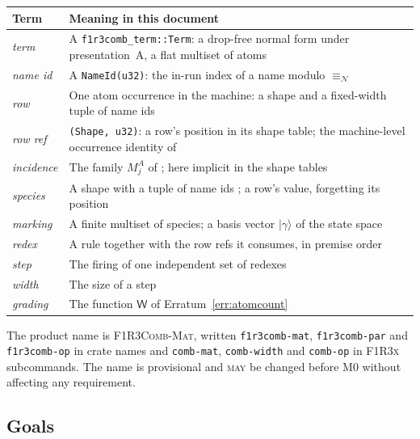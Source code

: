 \documentclass[11pt,a4paper]{article}
\newcommand{\code}[1]{\texttt{#1}}
\newcommand{\Mat}{\textsc{F1R3Comb-Mat}}
\newcommand{\Fx}{\textsc{F1R3x}}
\newcommand{\MAY}{\textsc{may}}
\newcommand{\nequiv}{\equiv_{\mathcal{N}}}
\newcommand{\Wt}{\mathsf{W}}
\theoremstyle{definition}
\theoremstyle{plain}
\begin{document}
\begin{center}
\begin{tabularx}{\linewidth}{@{}l>{\raggedright\arraybackslash}X@{}}
\toprule
Term & Meaning in this document\\
\midrule
\emph{term} & A \code{f1r3comb\_term::Term}: a drop-free normal form under
presentation~A, a flat multiset of atoms \cite[Req.~4.4]{combspec}\\
\emph{name id} & A \code{NameId(u32)}: the in-run index of a name modulo
$\nequiv$\\
\emph{row} & One atom occurrence in the machine: a shape and a fixed-width
tuple of name ids\\
\emph{row ref} & \code{(Shape, u32)}: a row's position in its shape table;
the machine-level occurrence identity of \cite[Def.~8.1]{matnote}\\
\emph{incidence} & The family $M^{A}_{j}$ of \cite[Def.~7.1]{matnote}; here
implicit in the shape tables\\
\emph{species} & A shape with a tuple of name ids \cite[Def.~4.1]{matnote}; a
row's value, forgetting its position\\
\emph{marking} & A finite multiset of species; a basis vector
$|\gamma\rangle$ of the state space\\
\emph{redex} & A rule together with the row refs it consumes, in premise
order\\
\emph{step} & The firing of one independent set of redexes\\
\emph{width} & The size of a step\\
\emph{grading} & The function $\Wt$ of Erratum~\ref{err:atomcount}\\
\bottomrule
\end{tabularx}
\end{center}

\noindent
The product name is \Mat{}, written \code{f1r3comb-mat}, \code{f1r3comb-par}
and \code{f1r3comb-op} in crate names and \code{comb-mat}, \code{comb-width}
and \code{comb-op} in \Fx{} subcommands. The name is provisional and \MAY{} be
changed before M0 without affecting any requirement.

\subsection{Goals}
\end{document}
